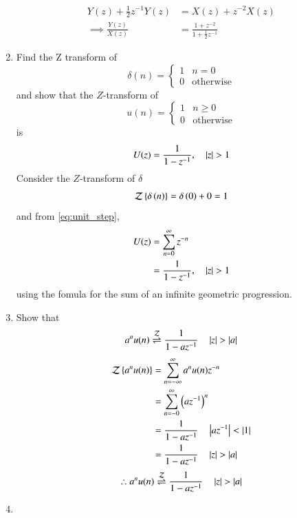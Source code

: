 \documentclass[journal,12pt,twocolumn]{IEEEtran}
\renewcommand\thesection{\arabic{section}}
\begin{document}
\begin{enumerate}[label=\thesection.\arabic*]
\begin{align}
Y(z) + \frac{1}{2}z^{-1}Y(z) &= X(z)+z^{-2}X(z)
\\
\implies \frac{Y(z)}{X(z)} &= \frac{1 + z^{-2}}{1 + \frac{1}{2}z^{-1}}
\label{eq:freq_resp}
\end{align}
%
\item Find the Z transform of 
\begin{equation}
\delta(n)
=
\begin{cases}
1 & n = 0
\\
0 & \text{otherwise}
\end{cases}
\end{equation}
and show that the $Z$-transform of
\begin{equation}
\label{eq:unit_step}
u(n)
=
\begin{cases}
1 & n \ge 0
\\
0 & \text{otherwise}
\end{cases}
\end{equation}
is
\begin{equation}
U(z) = \frac{1}{1-z^{-1}}, \quad \left\vert z\right\vert > 1
\end{equation}
\solution Consider the $Z$-transform of $\delta$
\begin{align}
	\mathcal{Z}\left\{\delta\left(n\right)\right\} = \delta\left(0\right) + 0 = 1
\end{align}
and from \eqref{eq:unit_step},
\begin{align}
U(z) &= \sum _{n= 0}^{\infty}z^{-n}
\\
&=\frac{1}{1-z^{-1}}, \quad \left\vert z\right\vert > 1
\end{align}
using the fomula for the sum of an infinite geometric progression.
%
\item Show that 
\begin{equation}
\label{eq:anun}
a^nu(n) \overset{\mathcal{Z}}{ \rightleftharpoons} \frac{1}{1-az^{-1}} \quad \left\vert z\right\vert > \left\vert a\right\vert
\end{equation}
\solution 
\begin{align}
\mathcal{Z}\left\{a^nu(n)\right\} &= \sum _{n=-\infty }^{\infty }a^nu(n)z^{-n}\\ &= \sum _{n=-0 }^{\infty }\left(a{z^{-1}}\right)^n\\ &= \frac{1}{1-a{z^{-1}}} \quad \left\vert a{z^{-1}}\right\vert < \left\vert1\right\vert\\ &= \frac{1}{1-a{z^{-1}}} \quad \left\vert z\right\vert > \left\vert a\right\vert
\end{align}
\begin{equation}
\therefore a^nu(n) \overset{\mathcal{Z}}{ \rightleftharpoons} \frac{1}{1-az^{-1}} \quad \left\vert z\right\vert > \left\vert a\right\vert
\end{equation}
\item 

\end{enumerate}
\end{document}
